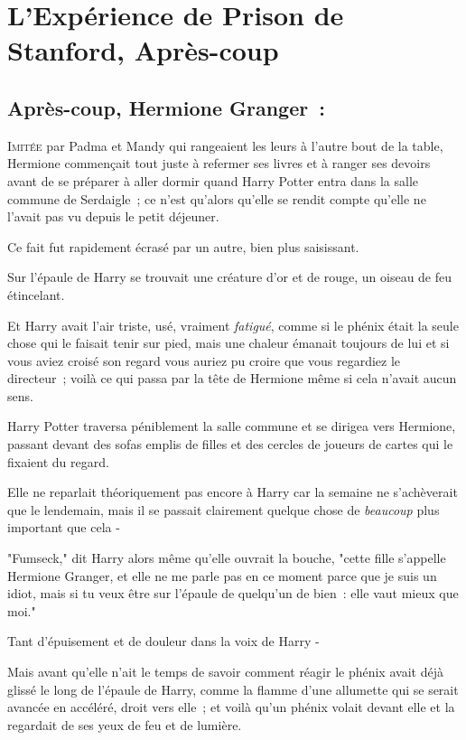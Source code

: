 \chapter{L'Expérience de Prison de Stanford, Après-coup}

\section{Après-coup, Hermione Granger~:}

\lettrine{I}{mitée} par Padma et Mandy qui rangeaient les leurs à l'autre bout de la table, Hermione commençait tout juste à refermer ses livres et à ranger ses devoirs avant de se préparer à aller dormir quand Harry Potter entra dans la salle commune de Serdaigle~; ce n'est qu'alors qu'elle se rendit compte qu'elle ne l'avait pas vu depuis le petit déjeuner.

Ce fait fut rapidement écrasé par un autre, bien plus saisissant.

Sur l'épaule de Harry se trouvait une créature d'or et de rouge, un oiseau de feu étincelant.

Et Harry avait l'air triste, usé, vraiment \emph{fatigué}, comme si le phénix était la seule chose qui le faisait tenir sur pied, mais une chaleur émanait toujours de lui et si vous aviez croisé son regard vous auriez pu croire que vous regardiez le directeur~; voilà ce qui passa par la tête de Hermione même si cela n'avait aucun sens.

Harry Potter traversa péniblement la salle commune et se dirigea vers Hermione, passant devant des sofas emplis de filles et des cercles de joueurs de cartes qui le fixaient du regard.

Elle ne reparlait théoriquement pas encore à Harry car la semaine ne s'achèverait que le lendemain, mais il se passait clairement quelque chose de \emph{beaucoup} plus important que cela -

"Fumseck," dit Harry alors même qu'elle ouvrait la bouche, "cette fille s'appelle Hermione Granger, et elle ne me parle pas en ce moment parce que je suis un idiot, mais si tu veux être sur l'épaule de quelqu'un de bien~: elle vaut mieux que moi."

Tant d'épuisement et de douleur dans la voix de Harry -

Mais avant qu'elle n'ait le temps de savoir comment réagir le phénix avait déjà glissé le long de l'épaule de Harry, comme la flamme d'une allumette qui se serait avancée en accéléré, droit vers elle~; et voilà qu'un phénix volait devant elle et la regardait de ses yeux de feu et de lumière.

